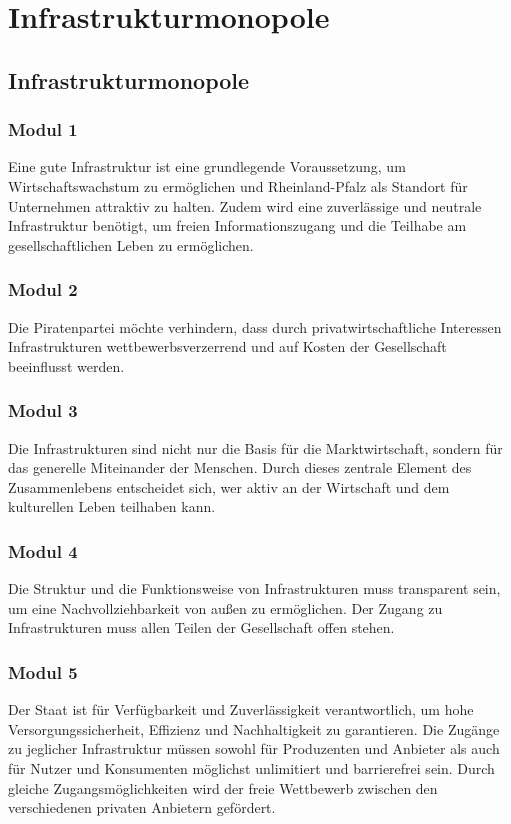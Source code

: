 \section{Infrastrukturmonopole}

\subsection*{Infrastrukturmonopole}

\subsubsection{Modul 1}
\abstimmung
Eine gute Infrastruktur ist eine grundlegende Voraussetzung, um Wirtschaftswachstum zu ermöglichen und Rheinland-Pfalz als Standort für Unternehmen attraktiv zu halten. Zudem wird eine zuverlässige und neutrale Infrastruktur benötigt, um freien Informationszugang und die Teilhabe am gesellschaftlichen Leben zu ermöglichen.

\subsubsection{Modul 2}
\abstimmung
Die Piratenpartei möchte verhindern, dass durch privatwirtschaftliche Interessen Infrastrukturen wettbewerbsverzerrend und auf Kosten der Gesellschaft beeinflusst werden.

\subsubsection{Modul 3}
\abstimmung
Die Infrastrukturen sind nicht nur die Basis für die Marktwirtschaft, sondern für das generelle Miteinander der Menschen. Durch dieses zentrale Element des Zusammenlebens entscheidet sich, wer aktiv an der Wirtschaft und dem kulturellen Leben teilhaben kann.

\subsubsection{Modul 4}
\abstimmung
Die Struktur und die Funktionsweise von Infrastrukturen muss transparent sein, um eine Nachvollziehbarkeit von außen zu ermöglichen. Der Zugang zu Infrastrukturen muss allen Teilen der Gesellschaft offen stehen.

\subsubsection{Modul 5}
\abstimmung
Der Staat ist für Verfügbarkeit und Zuverlässigkeit verantwortlich, um hohe Versorgungssicherheit, Effizienz und Nachhaltigkeit zu garantieren. Die Zugänge zu jeglicher Infrastruktur müssen sowohl für Produzenten und Anbieter als auch für Nutzer und Konsumenten möglichst unlimitiert und barrierefrei sein. Durch gleiche Zugangsmöglichkeiten wird der freie Wettbewerb zwischen den verschiedenen privaten Anbietern gefördert.

